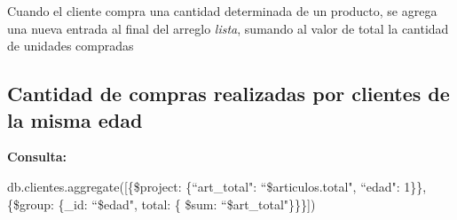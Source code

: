 Cuando el cliente compra una cantidad determinada de un producto, se agrega una nueva entrada al
final del arreglo \emph{lista}, sumando al valor de total la cantidad de unidades compradas

\vspace{3em}

\subsection{Cantidad de compras realizadas por clientes de la misma edad}

\textbf{Consulta: }

db.clientes.aggregate([\{\$project: \{``art_total": ``\$articulos.total", ``edad": 1\}\}, \{\$group: \{_id: ``\$edad", total: \{ \$sum: ``\$art_total"\}\}\}])














